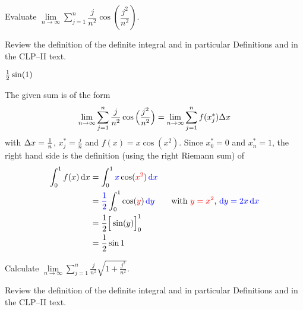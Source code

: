 
\begin{question}[2001A]
 Evaluate $\displaystyle\lim\limits_{n\rightarrow\infty}
\sum\limits_{j=1}^n \dfrac{j}{n^2}\cos\left(\dfrac{j^2}{n^2}\right)$.
\end{question}

\begin{hint}
Review the definition of the definite integral and in particular
Definitions    and
                  in the
CLP--II text.
\end{hint}

\begin{answer}
$\tfrac{1}{2}\sin(1)$
\end{answer}

\begin{solution}
The given sum is of the form
\begin{align*}
\lim_{n\rightarrow\infty}\sum_{j=1}^n
\frac{j}{n^2}\cos\Big(\frac{j^2}{n^2}\Big)
=\lim_{n\rightarrow\infty}\sum_{j=1}^n f(x_j^*)\Delta x
\end{align*}
with $\Delta x=\frac{1}{n}$, $x_j^*=\frac{j}{n}$ and $f(x)=x\cos(x^2)$.
Since $x_0^*=0$ and $x_n^*=1$, the right hand side is the definition
(using the right Riemann sum) of
\begin{align*}
\int_0^1 f(x)\,\mathrm{d}x
&=\int_0^1 \textcolor{blue}{x}\cos(\textcolor{red}{x^2})\,\textcolor{blue}{\mathrm{d}x} \\
&=\textcolor{blue}{\frac{1}{2}}\int_0^1 \cos(\textcolor{red}{y})\,\textcolor{blue}{\mathrm{d}y }\qquad\text{with $\textcolor{red}{y=x^2}$, $\textcolor{blue}{\mathrm{d}y=2x\,\mathrm{d}x}$} \\
&=\frac{1}{2}\Big[\sin(y)\Big]_0^1 \\
&=\frac{1}{2}\sin 1
\end{align*}

\end{solution}



\begin{question}[2001D]
Calculate $\displaystyle\lim\limits_{n\rightarrow\infty}\sum\limits_{j=1}^n
\frac{j}{n^2}\sqrt{1+\frac{j^2}{n^2}}$.
\end{question}

\begin{hint}
Review the definition of the definite integral and in particular
Definitions    and
                  in the
CLP--II text.
\end{hint}

